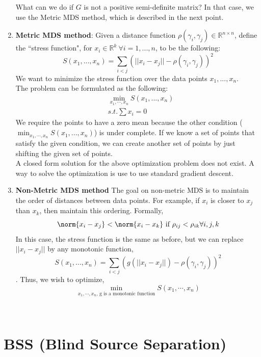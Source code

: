 \begin{enumerate}
What can we do if $G$ is not a positive semi-definite matrix? In that case, we use the Metric MDS method, which is described in the next point.
\item \textbf{Metric MDS method}: Given a distance function $\rho(\gamma_i, \gamma_j) \in \mathbb{R}^{n\times n}$, define the
``stress function", for $x_i \in \mathbb{R}^k \ \forall i=1,...,n$, to
be the following: 
\[
S(x_1,...,x_n) = \sum_{i<j}(||x_i-x_j||-\rho(\gamma_i, \gamma_j))^2
\]
We want to minimize the stress function over the data points $x_1,...,x_n$.\\
The problem can be formulated as the following:\\
\begin{align*}
&\min_{x_1 ,\cdots,x_n} S(x_1,...,x_n)\\
&s.t. \sum x_i = 0
\end{align*}
We require the points to have a zero mean because the other condition ($\min_{x_1 ,\cdots,x_n} S(x_1,...,x_n)$) is under complete. If we know a set of points that satisfy the given condition, we can create another set of points by just shifting the given set of points.\\
A closed form solution for the above optimization problem does not exist. A way to solve the optimization is use to use standard gradient descent.\\ 
\item \textbf{Non-Metric MDS method} The goal on non-metric MDS is to maintain the order of distances
between data points. For example, if $x_{i}$ is closer to $x_{j}$ than
$x_{k}$, then maintain this ordering. Formally,
$$\norm{x_i - x_j} < \norm{x_i - x_k} \text{ if } \rho_{ij}< \rho_{ik} \forall i,j, k$$
In this case, the stress function is the same as before, but we can replace $||x_{i} - x_{j}||$ by any monotonic function,
$$S(x_1,...,x_n) = \sum_{i<j}(g(||x_i-x_j||)-\rho(\gamma_i, \gamma_j))^2$$. 
Thus, we wish to optimize, 
$$\min_{x_1,\cdots, x_n \text{, g is a monotonic function}} S(x_1,\cdots, x_n)$$
\end{enumerate}



\noindent   \\




\section{BSS (Blind Source Separation) } 

